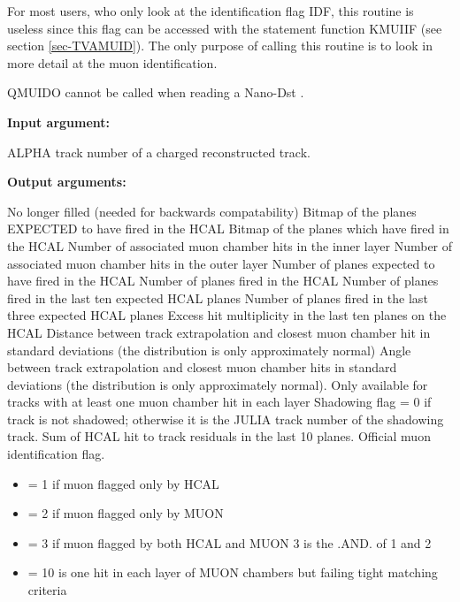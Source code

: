 For most users, who only look at the identification flag
IDF, this routine is useless since this flag
can be accessed with the statement function KMUIIF (see section \ref{sec-TVAMUID}).
  The only purpose of calling  this routine
is to look in more detail at the muon identification.
\par
  QMUIDO cannot be called when reading a Nano-Dst .
\par
{\bf Input argument:}
\begin{indentlist}{ 3.50cm}{ 3.75cm}
ALPHA track number of a charged reconstructed track.
\end{indentlist}
\par
{\bf Output arguments:}
\begin{indentlist}{ 3.50cm}{ 3.75cm}
No longer filled (needed for backwards compatability)
Bitmap of the planes EXPECTED to have fired in the HCAL
Bitmap of the planes which have fired in the HCAL
Number of associated muon chamber hits in the inner layer
Number of associated muon chamber hits in the outer layer
Number of planes expected to have fired in the HCAL
Number of planes fired in the HCAL
Number of planes fired in the last ten expected HCAL planes
Number of planes fired in the last three expected HCAL planes
Excess hit multiplicity in the last ten planes on the HCAL
Distance between track extrapolation and closest muon chamber hit in
standard deviations (the distribution is only approximately normal)
    Angle between track extrapolation and closest muon chamber hits in
       standard deviations (the distribution is only approximately normal).
       Only available for tracks with at least one muon chamber hit in each
       layer
Shadowing flag = 0 if track is not shadowed; otherwise it is the JULIA
       track number of the shadowing track.
Sum of HCAL hit to track residuals in the last 10 planes.
Official muon identification flag.
\begin{itemize}
\item     = 1 if muon flagged only by HCAL
\item     = 2 if muon flagged only by MUON
\item     = 3 if muon flagged by both HCAL and MUON
               3 is the .AND. of 1 and 2
\item     = 10 is one hit in each layer of MUON chambers but failing tight matching criteria

\end{itemize}
\end{indentlist}
